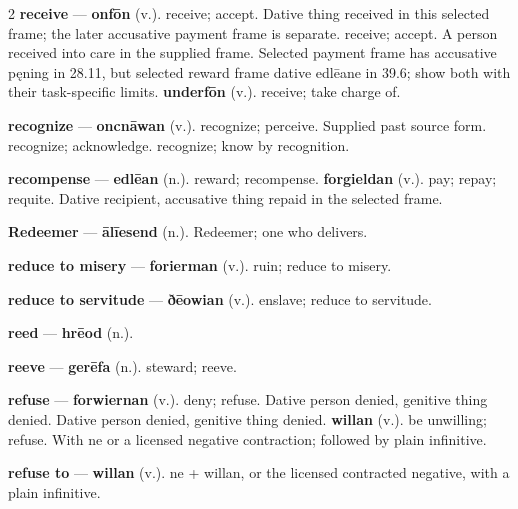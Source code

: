 \begin{multicols}{2}
\textbf{receive} — \textbf{onfōn} (v.). receive; accept. Dative thing received in this selected frame; the later accusative payment frame is separate. receive; accept. A person received into care in the supplied frame. Selected payment frame has accusative pęning in 28.11, but selected reward frame dative edlēane in 39.6; show both with their task-specific limits. \textbf{underfōn} (v.). receive; take charge of.\par
\textbf{recognize} — \textbf{oncnāwan} (v.). recognize; perceive. Supplied past source form. recognize; acknowledge. recognize; know by recognition.\par
\textbf{recompense} — \textbf{edlēan} (n.). reward; recompense. \textbf{forgieldan} (v.). pay; repay; requite. Dative recipient, accusative thing repaid in the selected frame.\par
\textbf{Redeemer} — \textbf{ālīesend} (n.). Redeemer; one who delivers.\par
\textbf{reduce to misery} — \textbf{forierman} (v.). ruin; reduce to misery.\par
\textbf{reduce to servitude} — \textbf{ðēowian} (v.). enslave; reduce to servitude.\par
\textbf{reed} — \textbf{hrēod} (n.).\par
\textbf{reeve} — \textbf{gerēfa} (n.). steward; reeve.\par
\textbf{refuse} — \textbf{forwiernan} (v.). deny; refuse. Dative person denied, genitive thing denied. Dative person denied, genitive thing denied. \textbf{willan} (v.). be unwilling; refuse. With ne or a licensed negative contraction; followed by plain infinitive.\par
\textbf{refuse to} — \textbf{willan} (v.). ne + willan, or the licensed contracted negative, with a plain infinitive.\par

\end{multicols}
